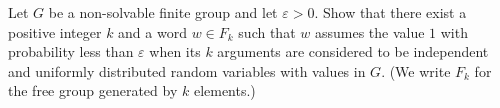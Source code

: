 Let $G$ be a non-solvable finite group and let $\varepsilon > 0$. Show that there exist a positive integer $k$ and a word $w\in F_k$ such that $w$ assumes the value $1$ with probability less than $\varepsilon$ when its $k$ arguments are considered to be independent and uniformly distributed random variables with values in $G$. (We write $F_k$ for the free group generated by $k$ elements.)